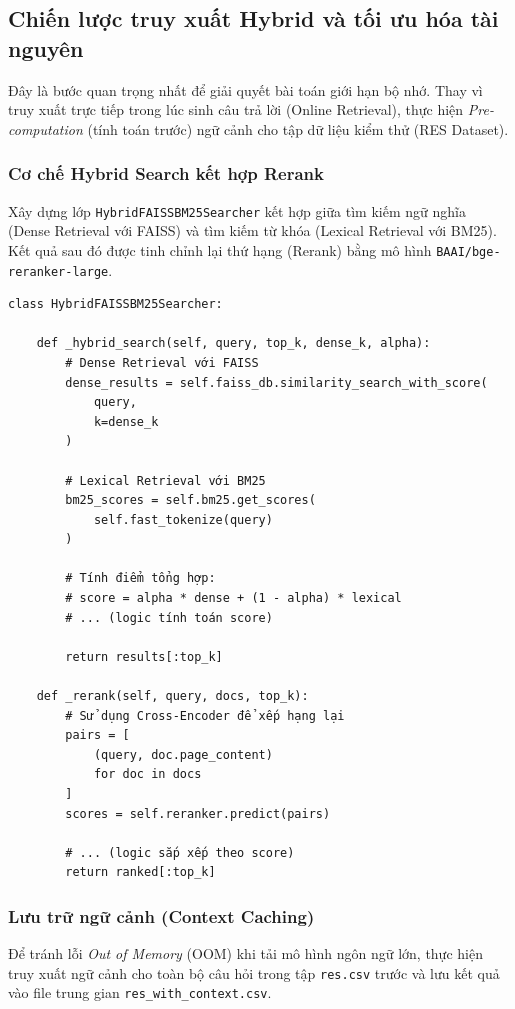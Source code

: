 \subsection{Chiến lược truy xuất Hybrid và tối ưu hóa tài nguyên}
 
Đây là bước quan trọng nhất để giải quyết bài toán giới hạn bộ nhớ. Thay vì truy xuất trực
tiếp trong lúc sinh câu trả lời (Online Retrieval), thực hiện \textit{Pre-computation} (tính toán trước)
ngữ cảnh cho tập dữ liệu kiểm thử (RES Dataset).
 
\subsubsection{Cơ chế Hybrid Search kết hợp Rerank}
 
Xây dựng lớp \texttt{HybridFAISSBM25Searcher} kết hợp giữa tìm kiếm ngữ nghĩa (Dense Retrieval với
FAISS) và tìm kiếm từ khóa (Lexical Retrieval với BM25). Kết quả sau đó được tinh chỉnh lại
thứ hạng (Rerank) bằng mô hình \texttt{BAAI/bge-reranker-large}.
 
\begin{verbatim}
class HybridFAISSBM25Searcher:
 
    def _hybrid_search(self, query, top_k, dense_k, alpha):
        # Dense Retrieval với FAISS
        dense_results = self.faiss_db.similarity_search_with_score(
            query,
            k=dense_k
        )
 
        # Lexical Retrieval với BM25
        bm25_scores = self.bm25.get_scores(
            self.fast_tokenize(query)
        )
 
        # Tính điểm tổng hợp:
        # score = alpha * dense + (1 - alpha) * lexical
        # ... (logic tính toán score)
 
        return results[:top_k]
 
    def _rerank(self, query, docs, top_k):
        # Sử dụng Cross-Encoder để xếp hạng lại
        pairs = [
            (query, doc.page_content)
            for doc in docs
        ]
        scores = self.reranker.predict(pairs)
 
        # ... (logic sắp xếp theo score)
        return ranked[:top_k]
\end{verbatim}
 
\subsubsection{Lưu trữ ngữ cảnh (Context Caching)}
 
Để tránh lỗi \textit{Out of Memory} (OOM) khi tải mô hình ngôn ngữ lớn, thực hiện truy xuất
ngữ cảnh cho toàn bộ câu hỏi trong tập \texttt{res.csv} trước và lưu kết quả vào file trung gian
\texttt{res\_with\_context.csv}.
 
